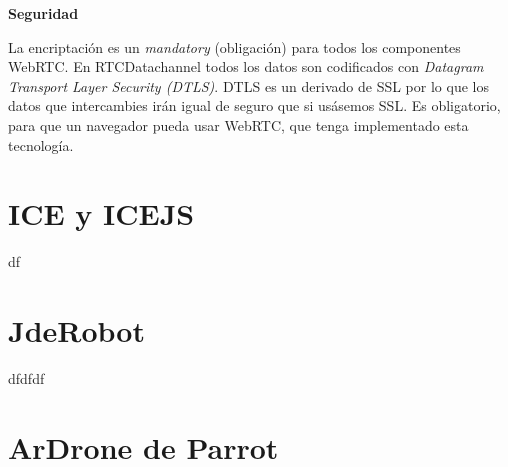 \begin{normalsize}
\noindent \textbf{Seguridad}\\
\end{normalsize}

La encriptación es un \textit{mandatory} (obligación) para todos los componentes WebRTC. En RTCDatachannel todos los datos son codificados con \textit{Datagram Transport Layer Security (DTLS)}. DTLS es un derivado de SSL por lo que los datos que intercambies irán igual de seguro que si usásemos SSL. Es obligatorio, para que un navegador pueda usar WebRTC, que tenga implementado esta tecnología.

\section{ICE y ICEJS}

df

\section{JdeRobot}

dfdfdf

\section{ArDrone de Parrot}

